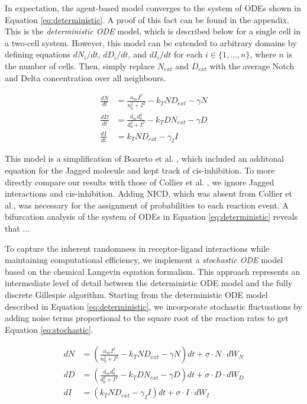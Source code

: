 \documentclass{article}
\begin{document}
\begin{flushleft}
\medskip

In expectation, the agent-based model converges to the system of ODEs shown in Equation \ref{eq:deterministic}.
A proof of this fact can be found in the appendix.
This is the \emph{deterministic ODE} model, which is described below for a single cell in a two-cell system.
However, this model can be extended to arbitrary domains by defining equations $dN_{i}/dt$, $dD_{i}/dt$, and $dI_{i}/dt$ for each $i \in \{ 1, \dots, n \}$, where $n$ is the number of cells.
Then, simply replace $N_{ext}$ and $D_{ext}$ with the average Notch and Delta concentration over all neighbours.

\begin{equation}
\begin{aligned}
  \frac{dN}{dt} &= \frac{n_{m}I^2}{n_{0}^2 + I^2} - k_{T}ND_{ext} - \gamma N \\[5pt]
  \frac{dD}{dt} &= \frac{d_{m}d_{0}^2}{d_{0}^2 + I^2} - k_{T}DN_{ext} - \gamma D \\[5pt]
  \frac{dI}{dt} &= k_{T}ND_{ext} - \gamma_{I}I
\end{aligned}
\label{eq:deterministic}
\end{equation}

This model is a simplification of Boareto et al. \cite{boareto_jaggeddelta_2015}, which included an additonal equation for the Jagged molecule and kept track of cis-inhibition.
To more directly compare our results with those of Collier et al. \cite{collier_pattern_1996}, we ignore Jagged interactions and cis-inhibition.
Adding NICD, which was absent from Collier et al., was necessary for the assignment of probabilities to each reaction event.
A bifurcation analysis of the system of ODEs in Equation \ref{eq:deterministic} reveals that ...

\medskip

To capture the inherent randomness in receptor-ligand interactions while maintaining computational efficiency, we implement a \emph{stochastic ODE} model based on the chemical Langevin equation formalism.
This approach represents an intermediate level of detail between the deterministic ODE model and the fully discrete Gillespie algorithm.
Starting from the deterministic ODE model described in Equation \ref{eq:deterministic}, we incorporate stochastic fluctuations by adding noise terms proportional to the square root of the reaction rates to get Equation \ref{eq:stochastic}.

\begin{equation}
\begin{aligned}
  dN &= \left( \frac{n_{m}I^2}{n_{0}^2 + I^2} - k_{T}ND_{ext} - \gamma N \right) dt + \sigma \cdot N \cdot dW_{N} \\[5pt]
  dD &= \left( \frac{d_{m}d_{0}^2}{d_{0}^2 + I^2} - k_{T}DN_{ext} - \gamma D \right)  dt + \sigma \cdot D \cdot dW_{D}  \\[5pt]
  dI &= \left( k_{T}ND_{ext} - \gamma_{I}I \right) dt + \sigma \cdot I \cdot dW_{I}
\end{aligned}
\label{eq:stochastic}
\end{equation}


\end{flushleft}
\end{document}
